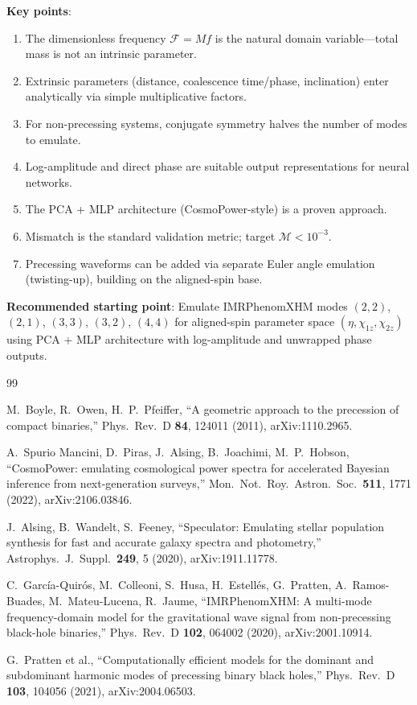 \documentclass[11pt,a4paper]{article}
\newcommand{\Mf}{\mathcal{F}}
\begin{document}
\textbf{Key points}:
\begin{enumerate}
    \item The dimensionless frequency $\Mf = Mf$ is the natural domain variable---total mass is not an intrinsic parameter.
    \item Extrinsic parameters (distance, coalescence time/phase, inclination) enter analytically via simple multiplicative factors.
    \item For non-precessing systems, conjugate symmetry halves the number of modes to emulate.
    \item Log-amplitude and direct phase are suitable output representations for neural networks.
    \item The PCA + MLP architecture (CosmoPower-style) is a proven approach.
    \item Mismatch is the standard validation metric; target $\mathcal{M} < 10^{-3}$.
    \item Precessing waveforms can be added via separate Euler angle emulation (twisting-up), building on the aligned-spin base.
\end{enumerate}

\textbf{Recommended starting point}: Emulate IMRPhenomXHM modes $(2,2)$, $(2,1)$, $(3,3)$, $(3,2)$, $(4,4)$ for aligned-spin parameter space $(\eta, \chi_{1z}, \chi_{2z})$ using PCA + MLP architecture with log-amplitude and unwrapped phase outputs.

\begin{thebibliography}{99}

M.~Boyle, R.~Owen, H.~P.~Pfeiffer,
``A geometric approach to the precession of compact binaries,''
Phys.\ Rev.\ D \textbf{84}, 124011 (2011), arXiv:1110.2965.

A.~Spurio Mancini, D.~Piras, J.~Alsing, B.~Joachimi, M.~P.~Hobson,
``CosmoPower: emulating cosmological power spectra for accelerated Bayesian inference from next-generation surveys,''
Mon.\ Not.\ Roy.\ Astron.\ Soc.\ \textbf{511}, 1771 (2022), arXiv:2106.03846.

J.~Alsing, B.~Wandelt, S.~Feeney,
``Speculator: Emulating stellar population synthesis for fast and accurate galaxy spectra and photometry,''
Astrophys.\ J.\ Suppl.\ \textbf{249}, 5 (2020), arXiv:1911.11778.

C.~Garc\'ia-Quir\'os, M.~Colleoni, S.~Husa, H.~Estell\'es, G.~Pratten, A.~Ramos-Buades, M.~Mateu-Lucena, R.~Jaume,
``IMRPhenomXHM: A multi-mode frequency-domain model for the gravitational wave signal from non-precessing black-hole binaries,''
Phys.\ Rev.\ D \textbf{102}, 064002 (2020), arXiv:2001.10914.

G.~Pratten et al.,
``Computationally efficient models for the dominant and subdominant harmonic modes of precessing binary black holes,''
Phys.\ Rev.\ D \textbf{103}, 104056 (2021), arXiv:2004.06503.

\end{thebibliography}
\end{document}
